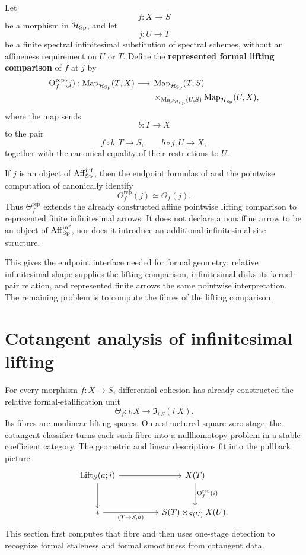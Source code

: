 \begin{construction}
\label{con:represented-formal-lifting-comparison}
Let
\[
    f:X\longrightarrow S
\]
be a morphism in \(\mathcal H_{\operatorname{Sp}}\), and let
\[
    j:U\longrightarrow T
\]
be a finite spectral infinitesimal substitution of spectral schemes, without
an affineness requirement on \(U\) or \(T\). Define the
\textbf{represented formal lifting comparison} of \(f\) at \(j\) by
\[
\begin{aligned}
    \Theta_f^{\mathrm{rep}}(j):
    \operatorname{Map}_{\mathcal H_{\operatorname{Sp}}}(T,X)
    \longrightarrow{}&
    \operatorname{Map}_{\mathcal H_{\operatorname{Sp}}}(T,S)
    \\
    &\times_{\operatorname{Map}_{\mathcal H_{\operatorname{Sp}}}(U,S)}
    \operatorname{Map}_{\mathcal H_{\operatorname{Sp}}}(U,X),
\end{aligned}
\]
where the map sends
\[
    b:T\longrightarrow X
\]
to the pair
\[
    f\circ b:T\longrightarrow S,
    \qquad
    b\circ j:U\longrightarrow X,
\]
together with the canonical equality of their restrictions to \(U\).

If \(j\) is an object of \(\operatorname{Aff}_{\operatorname{Sp}}^{\inf}\), then the endpoint formulas of
 and the pointwise computation of
 canonically identify
\[
    \Theta_f^{\mathrm{rep}}(j)
    \simeq
    \Theta_f(j).
\]
Thus \(\Theta_f^{\mathrm{rep}}\) extends the already constructed affine
pointwise lifting comparison to represented finite infinitesimal arrows. It
does not declare a nonaffine arrow to be an object of
\(\operatorname{Aff}_{\operatorname{Sp}}^{\inf}\), nor does it introduce an additional infinitesimal-site
structure.
\end{construction}
This gives the endpoint interface needed for formal geometry: relative
infinitesimal shape supplies the lifting comparison, infinitesimal disks its
kernel-pair relation, and represented finite arrows the same pointwise
interpretation. The remaining problem is to compute the fibres of the lifting
comparison.

\section{Cotangent analysis of infinitesimal lifting}
\label{sec:lifting-judgments}

For every morphism \(f:X\to S\), differential cohesion has already constructed
the relative formal-etalification unit
\[
    \Theta_f:i_!X\longrightarrow\Im_{i_!S}(i_!X).
\]
Its fibres are nonlinear lifting spaces. On a structured square-zero stage,
the cotangent classifier turns each such fibre into a nullhomotopy problem in a
stable coefficient category. The geometric and linear descriptions fit into
the pullback picture
\[
\begin{tikzcd}[column sep=huge,row sep=large]
\operatorname{Lift}_S(a;i) \arrow[r] \arrow[d]
    & X(T) \arrow[d,"{\Theta_f^{\mathrm{rep}}(i)}"]
\\
* \arrow[r,"{(T\to S,a)}"']
    & S(T)\times_{S(U)}X(U).
\end{tikzcd}
\]
This section first computes that fibre and then uses one-stage detection to
recognize formal \(\acute{e}\)taleness and formal smoothness from cotangent
data.

